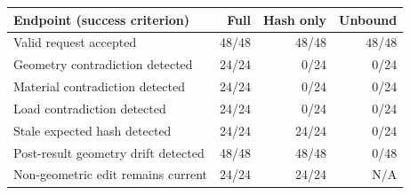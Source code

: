 \begin{tabular}{lrrr}
\toprule
Endpoint (success criterion) & Full & Hash only & Unbound \\
\midrule
Valid request accepted & 48/48 & 48/48 & 48/48 \\
Geometry contradiction detected & 24/24 & 0/24 & 0/24 \\
Material contradiction detected & 24/24 & 0/24 & 0/24 \\
Load contradiction detected & 24/24 & 0/24 & 0/24 \\
Stale expected hash detected & 24/24 & 24/24 & 0/24 \\
Post-result geometry drift detected & 48/48 & 48/48 & 0/48 \\
Non-geometric edit remains current & 24/24 & 24/24 & N/A \\
\bottomrule
\end{tabular}
